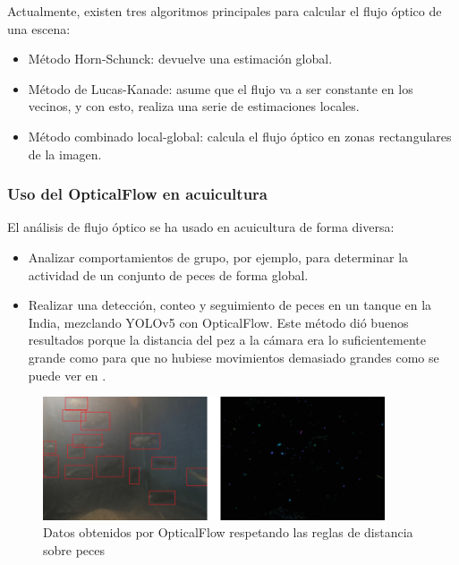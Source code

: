 Actualmente, existen tres algoritmos principales para calcular el flujo óptico de una escena:

\begin{itemize}
    \item Método Horn-Schunck: devuelve una estimación global.
    \item Método de Lucas-Kanade: asume que el flujo va a ser constante en los vecinos, y con esto, realiza una serie de estimaciones locales.
    \item Método combinado local-global: calcula el flujo óptico en zonas rectangulares de la imagen.
\end{itemize}

\subsubsection{Uso del OpticalFlow en acuicultura}

El análisis de flujo óptico se ha usado en acuicultura de forma diversa:

\begin{itemize}
    \item Analizar comportamientos de grupo, por ejemplo, para determinar la actividad de un conjunto de peces de forma global\cite{kobayashiAquaColonyFully2023}.
    \item Realizar una detección, conteo y seguimiento de peces en un tanque en la India, mezclando YOLOv5 con OpticalFlow\cite{paiComputerVisionBased2022}. Este método dió buenos resultados porque 
    la distancia del pez a la cámara era lo suficientemente grande como para que no hubiese movimientos demasiado grandes como se puede ver en .
\end{itemize}

\begin{figure}[H]
    \centering
    \includegraphics[width=0.9\textwidth]{images/4/OpticalFlowIndia.png}
    \caption{Datos obtenidos por OpticalFlow respetando las reglas de distancia sobre peces\cite{paiComputerVisionBased2022}}
\end{figure}
\clearpage



